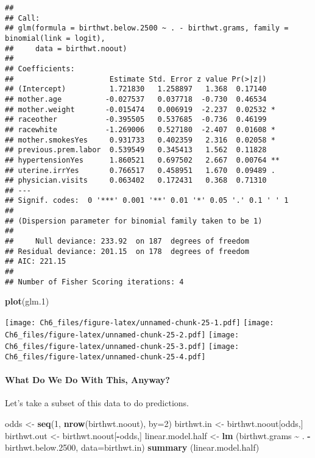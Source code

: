 \documentclass[
]{article}
\newenvironment{Shaded}{\begin{snugshade}}{\end{snugshade}}
\newcommand{\AttributeTok}[1]{\textcolor[rgb]{0.13,0.29,0.53}{#1}}
\newcommand{\DecValTok}[1]{\textcolor[rgb]{0.00,0.00,0.81}{#1}}
\newcommand{\FloatTok}[1]{\textcolor[rgb]{0.00,0.00,0.81}{#1}}
\newcommand{\FunctionTok}[1]{\textcolor[rgb]{0.13,0.29,0.53}{\textbf{#1}}}
\newcommand{\NormalTok}[1]{#1}
\newcommand{\OtherTok}[1]{\textcolor[rgb]{0.56,0.35,0.01}{#1}}
\newcommand{\SpecialCharTok}[1]{\textcolor[rgb]{0.81,0.36,0.00}{\textbf{#1}}}
\begin{document}
\begin{verbatim}
## 
## Call:
## glm(formula = birthwt.below.2500 ~ . - birthwt.grams, family = binomial(link = logit), 
##     data = birthwt.noout)
## 
## Coefficients:
##                      Estimate Std. Error z value Pr(>|z|)   
## (Intercept)          1.721830   1.258897   1.368  0.17140   
## mother.age          -0.027537   0.037718  -0.730  0.46534   
## mother.weight       -0.015474   0.006919  -2.237  0.02532 * 
## raceother           -0.395505   0.537685  -0.736  0.46199   
## racewhite           -1.269006   0.527180  -2.407  0.01608 * 
## mother.smokesYes     0.931733   0.402359   2.316  0.02058 * 
## previous.prem.labor  0.539549   0.345413   1.562  0.11828   
## hypertensionYes      1.860521   0.697502   2.667  0.00764 **
## uterine.irrYes       0.766517   0.458951   1.670  0.09489 . 
## physician.visits     0.063402   0.172431   0.368  0.71310   
## ---
## Signif. codes:  0 '***' 0.001 '**' 0.01 '*' 0.05 '.' 0.1 ' ' 1
## 
## (Dispersion parameter for binomial family taken to be 1)
## 
##     Null deviance: 233.92  on 187  degrees of freedom
## Residual deviance: 201.15  on 178  degrees of freedom
## AIC: 221.15
## 
## Number of Fisher Scoring iterations: 4
\end{verbatim}

\begin{Shaded}
\begin{Highlighting}[]
\FunctionTok{plot}\NormalTok{(glm}\FloatTok{.1}\NormalTok{)}
\end{Highlighting}
\end{Shaded}

\texttt{[image: Ch6\_files/figure-latex/unnamed-chunk-25-1.pdf]}
\texttt{[image: Ch6\_files/figure-latex/unnamed-chunk-25-2.pdf]}
\texttt{[image: Ch6\_files/figure-latex/unnamed-chunk-25-3.pdf]}
\texttt{[image: Ch6\_files/figure-latex/unnamed-chunk-25-4.pdf]}

\paragraph{What Do We Do With This,
Anyway?}\label{what-do-we-do-with-this-anyway}

Let's take a subset of this data to do predictions.

\begin{Shaded}
\begin{Highlighting}[]
\NormalTok{odds }\OtherTok{\textless{}{-}} \FunctionTok{seq}\NormalTok{(}\DecValTok{1}\NormalTok{, }\FunctionTok{nrow}\NormalTok{(birthwt.noout), }\AttributeTok{by=}\DecValTok{2}\NormalTok{)}
\NormalTok{birthwt.in }\OtherTok{\textless{}{-}}\NormalTok{ birthwt.noout[odds,]}
\NormalTok{birthwt.out }\OtherTok{\textless{}{-}}\NormalTok{ birthwt.noout[}\SpecialCharTok{{-}}\NormalTok{odds,]}
\NormalTok{linear.model.half }\OtherTok{\textless{}{-}} \FunctionTok{lm}\NormalTok{ (birthwt.grams }\SpecialCharTok{\textasciitilde{}}\NormalTok{ . }\SpecialCharTok{{-}}\NormalTok{ birthwt.below}\FloatTok{.2500}\NormalTok{, }\AttributeTok{data=}\NormalTok{birthwt.in)}
\FunctionTok{summary}\NormalTok{ (linear.model.half)}
\end{Highlighting}
\end{Shaded}
\end{document}
